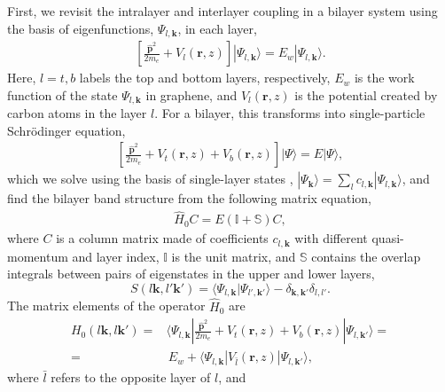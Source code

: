 \documentclass[showpacs,aps,prb,reprint,twocolumn]{revtex4-1}
\begin{document}
First, we revisit the intralayer and interlayer coupling in a bilayer system using the basis of eigenfunctions, $\Psi_{l,\boldsymbol{k}}$, in each layer,
\begin{align}\label{eq:schrodinger_monolayer}
\left[
\frac{\hat{\boldsymbol{p}}^2}{2m_e}+
V_{l}(\boldsymbol{r},z)\right]|\Psi_{l,\boldsymbol{k}}\rangle=
E_w|\Psi_{l,\boldsymbol{k}}\rangle.
\end{align}
Here, $l=t,b$ labels the top and bottom layers, respectively, $E_w$ is the work function of the state $\Psi_{l,\boldsymbol{k}}$ in graphene, and $V_{l}(\boldsymbol{r},z)$ is the potential created by carbon atoms in the layer $l$. For a bilayer, this transforms into single-particle Schr\"{o}dinger equation,
\begin{align}
\left[
\frac{\hat{\boldsymbol{p}}^2}{2m_e}+
V_{t}(\boldsymbol{r},z)+
V_{b}(\boldsymbol{r},z)\right]
|\Psi\rangle=
E|\Psi\rangle,
\end{align}
which we solve using the basis of single-layer states \cite{Dresselhaus_2001}, $|\Psi_{\boldsymbol{k}}\rangle= \sum_{l} c_{l,\boldsymbol{k}} |\Psi_{l,\boldsymbol{k}}\rangle$, and find the bilayer band structure from the following matrix equation,
\begin{align}\label{eq:Matrix_Equation_general}
\hat{H}_{0}C=E(\mathbb{I}+\mathbb{S})C,
\end{align}
where $C$ is a column matrix made of coefficients $c_{l,\boldsymbol{k}}$ with different quasi-momentum and layer index, $\mathbb{I}$ is the unit matrix, and $\mathbb{S}$ contains the overlap integrals between pairs of eigenstates in the upper and lower layers,
\begin{equation}\label{eq:Overlap_general}
S(l\boldsymbol{k},l'\boldsymbol{k}')=
\langle \Psi_{l,\boldsymbol{k}}|
\Psi_{l',\boldsymbol{k}'}\rangle - \delta_{\boldsymbol{k},\boldsymbol{k}'} \delta_{l,l'}.
\end{equation}
The matrix elements of the operator $\hat{H}_0$ are
\begin{align}\label{eq:H0_intra_general}
H_0(l\boldsymbol{k},l\boldsymbol{k}')=&
\langle \Psi_{l,\boldsymbol{k}}
|\frac{\hat{\boldsymbol{p}}^2}{2m_e}+
V_{t}(\boldsymbol{r},z)+
V_{b}(\boldsymbol{r},z)|
\Psi_{l,\boldsymbol{k}'}\rangle=\\
=&\,E_w+
\langle \Psi_{l,\boldsymbol{k}}
|
V_{\bar{l}}(\boldsymbol{r},z)|
\Psi_{l,\boldsymbol{k}'}\rangle\nonumber,
\end{align}
where $\bar{l}$ refers to the opposite layer of $l$, and
\end{document}
